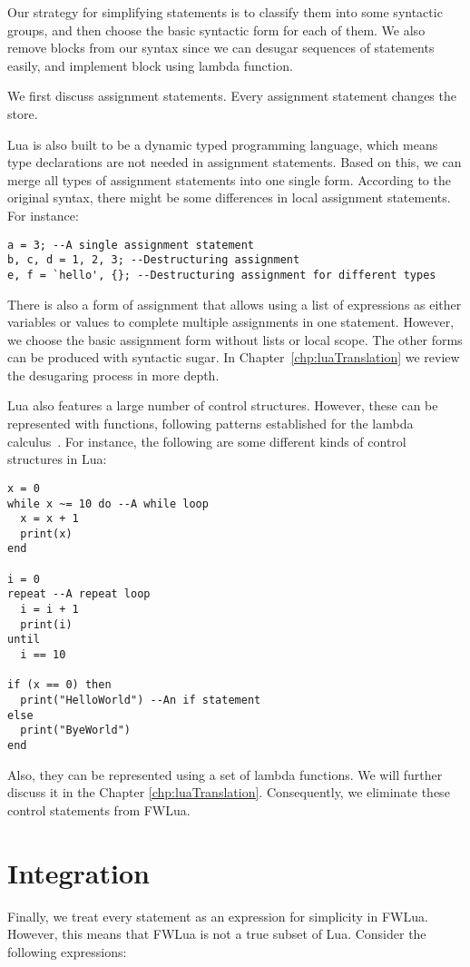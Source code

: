 Our strategy for simplifying statements is to classify them into some syntactic groups, and then choose the basic syntactic form for each of them.
We also remove blocks from our syntax since we can desugar sequences of statements easily, and implement block using lambda function.

We first discuss assignment statements. Every assignment statement changes the store. 

Lua is also built to be a dynamic typed programming language, which means type declarations are not needed in assignment statements. Based on this, we can merge all types of assignment statements into one single form. According to the original syntax, there might be some differences in local assignment statements. For instance:

\newpage
\begin{verbatim}
a = 3; --A single assignment statement
b, c, d = 1, 2, 3; --Destructuring assignment
e, f = `hello', {}; --Destructuring assignment for different types
\end{verbatim}

There is also a form of assignment that allows using a list of expressions as either variables or values to complete multiple assignments in one statement. However, we choose the basic assignment form without lists or local scope. The other forms can be produced with syntactic sugar.
In Chapter~\ref{chp:luaTranslation} we review the desugaring process in more depth.

Lua also features a large number of control structures. However, these can be represented with functions, following patterns established for the lambda calculus~\cite{TAPL}. For instance, the following are some different kinds of control structures in Lua:

\begin{verbatim}
x = 0
while x ~= 10 do --A while loop
  x = x + 1
  print(x)
end

i = 0
repeat --A repeat loop
  i = i + 1
  print(i)
until
  i == 10

if (x == 0) then 
  print("HelloWorld") --An if statement
else 
  print("ByeWorld")
end
\end{verbatim}

Also, they can be represented using a set of lambda functions. We will further discuss it in the Chapter \ref{chp:luaTranslation}. Consequently, we eliminate these control statements from FWLua.

\section{Integration}
Finally, we treat every statement as an expression for simplicity in FWLua. However, this means that FWLua is not a true subset of Lua. Consider the following expressions:

